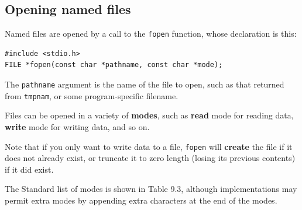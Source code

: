   

  \subsection{Opening named files}
   

   Named files are opened by a call to the \texttt{fopen} function,
    whose declaration is this:


   \begin{Verbatim}
#include <stdio.h>
FILE *fopen(const char *pathname, const char *mode);
\end{Verbatim}

   The \texttt{pathname} argument is the name of the file to open,  such
    as  that  returned  from  \texttt{tmpnam},  or  some program-specific
    filename.


   Files can be opened in a variety of \textbf{modes}, such as
    \textbf{read} mode for reading data, \textbf{write} mode for writing
    data, and so on.


   Note that if you only want to write data to  a  file, \texttt{fopen}
    will  \textbf{create}  the  file  if  it  does  not already exist, or
    truncate it to zero length (losing its previous contents) if it did
    exist.


   The Standard list of modes is shown in Table 9.3,  although
    implementations  may  permit  extra modes by appending extra characters at
    the end of the modes.


